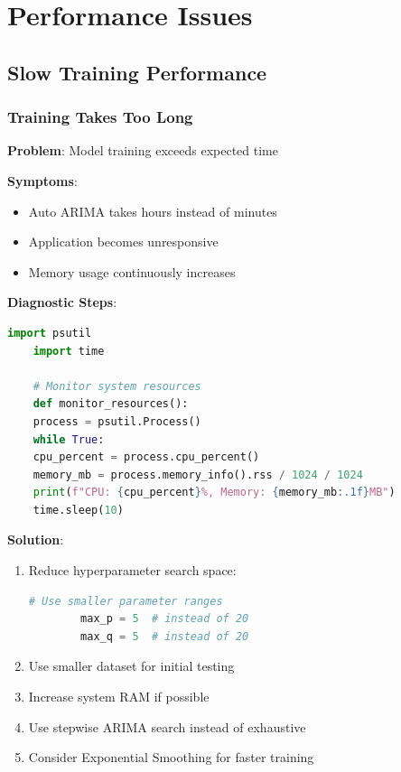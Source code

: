 \section{Performance Issues}

\subsection{Slow Training Performance}

\subsubsection{Training Takes Too Long}

\textbf{Problem}: Model training exceeds expected time

\textbf{Symptoms}:
\begin{itemize}
	\item Auto ARIMA takes hours instead of minutes
	\item Application becomes unresponsive
	\item Memory usage continuously increases
\end{itemize}

\textbf{Diagnostic Steps}:
\begin{lstlisting}[language=python,basicstyle=\color{blue}]
	import psutil
	import time
	
	# Monitor system resources
	def monitor_resources():
	process = psutil.Process()
	while True:
	cpu_percent = process.cpu_percent()
	memory_mb = process.memory_info().rss / 1024 / 1024
	print(f"CPU: {cpu_percent}%, Memory: {memory_mb:.1f}MB")
	time.sleep(10)
\end{lstlisting}

\textbf{Solution}:
\begin{enumerate}
	\item Reduce hyperparameter search space:
	\begin{lstlisting}[language=python]
		# Use smaller parameter ranges
		max_p = 5  # instead of 20
		max_q = 5  # instead of 20
	\end{lstlisting}
	\item Use smaller dataset for initial testing
	\item Increase system RAM if possible
	\item Use stepwise ARIMA search instead of exhaustive
	\item Consider Exponential Smoothing for faster training
\end{enumerate}

